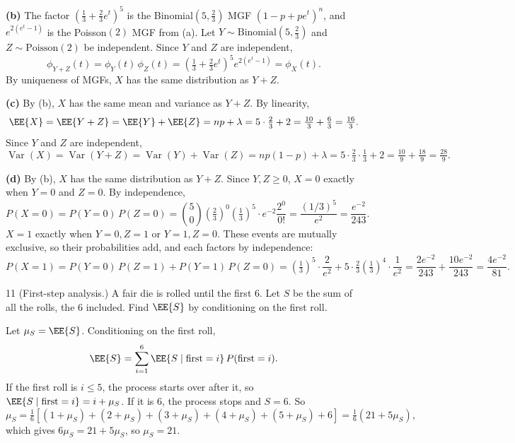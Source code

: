\documentclass[11pt]{article}
\begin{document}
\textbf{(b)} The factor $\left(\tfrac13 + \tfrac23 e^t\right)^5$ is the Binomial$(5, \tfrac23)$
MGF $(1 - p + pe^t)^n$, and $e^{2(e^t - 1)}$ is the Poisson$(2)$ MGF from (a).
Let $Y \sim \text{Binomial}(5, \tfrac23)$ and $Z \sim \text{Poisson}(2)$ be independent. Since
$Y$ and $Z$ are independent,
\[
  \phi_{Y+Z}(t) = \phi_Y(t)\,\phi_Z(t)
    = \left(\tfrac13 + \tfrac23 e^t\right)^5 e^{2(e^t - 1)} = \phi_X(t).
\]
By uniqueness of MGFs, $X$ has the same distribution as $Y + Z$.

\textbf{(c)} By (b), $X$ has the same mean and variance as $Y + Z$. By linearity,
\[
  \EE{X} = \EE{Y + Z} = \EE{Y} + \EE{Z} = np + \lambda
    = 5 \cdot \tfrac23 + 2 = \tfrac{10}{3} + \tfrac{6}{3} = \tfrac{16}{3}.
\]
Since $Y$ and $Z$ are independent,
\[
  \operatorname{Var}(X) = \operatorname{Var}(Y + Z) = \operatorname{Var}(Y) + \operatorname{Var}(Z)
    = np(1 - p) + \lambda = 5 \cdot \tfrac23 \cdot \tfrac13 + 2
    = \tfrac{10}{9} + \tfrac{18}{9} = \tfrac{28}{9}.
\]

\textbf{(d)} By (b), $X$ has the same distribution as $Y + Z$. Since $Y, Z \ge 0$,
$X = 0$ exactly when $Y = 0$ and $Z = 0$. By independence,
\[
  P(X = 0) = P(Y = 0)\,P(Z = 0)
    = \binom{5}{0}\left(\tfrac23\right)^0\left(\tfrac13\right)^5 \cdot e^{-2}\frac{2^0}{0!}
    = \frac{(1/3)^5}{e^2} = \frac{e^{-2}}{243}.
\]
$X = 1$ exactly when $Y = 0, Z = 1$ or $Y = 1, Z = 0$. These events are mutually exclusive,
so their probabilities add, and each factors by independence:
\[
  P(X = 1) = P(Y = 0)\,P(Z = 1) + P(Y = 1)\,P(Z = 0)
    = \left(\tfrac13\right)^5 \cdot \frac{2}{e^2} + 5 \cdot \tfrac23 \left(\tfrac13\right)^4 \cdot \frac{1}{e^2}
    = \frac{2e^{-2}}{243} + \frac{10e^{-2}}{243} = \frac{4e^{-2}}{81}.
\]

\begin{problem}{11}
  (First-step analysis.) A fair die is rolled until the first 6. Let $S$ be the sum of
  all the rolls, the 6 included. Find $\EE{S}$ by conditioning on the first roll.
\end{problem}
Let $\mu_S = \EE{S}$. Conditioning on the first roll,
\[
  \EE{S} = \sum_{i=1}^{6} \EE{S \mid \text{first} = i}\,P(\text{first} = i).
\]
If the first roll is $i \le 5$, the process starts over after it, so
$\EE{S \mid \text{first} = i} = i + \mu_S$. If it is $6$, the process stops and $S = 6$. So
\[
  \mu_S = \tfrac16\left[(1 + \mu_S) + (2 + \mu_S) + (3 + \mu_S) + (4 + \mu_S)
    + (5 + \mu_S) + 6\right] = \tfrac16\left(21 + 5\mu_S\right),
\]
which gives $6\mu_S = 21 + 5\mu_S$, so $\mu_S = 21$.
\end{document}
